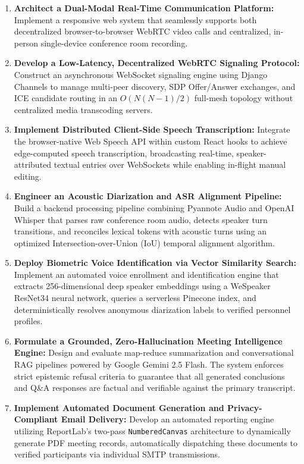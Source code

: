 \documentclass[12pt,oneside,letterpaper]{report}
\numberwithin{equation}{chapter} %
\begin{document}
\begin{enumerate}
    \item \textbf{Architect a Dual-Modal Real-Time Communication Platform:} Implement a responsive web system that seamlessly supports both decentralized browser-to-browser WebRTC video calls and centralized, in-person single-device conference room recording.
    
    \item \textbf{Develop a Low-Latency, Decentralized WebRTC Signaling Protocol:} Construct an asynchronous WebSocket signaling engine using Django Channels to manage multi-peer discovery, SDP Offer/Answer exchanges, and ICE candidate routing in an $O(N(N-1)/2)$ full-mesh topology without centralized media transcoding servers.
    
    \item \textbf{Implement Distributed Client-Side Speech Transcription:} Integrate the browser-native Web Speech API within custom React hooks to achieve edge-computed speech transcription, broadcasting real-time, speaker-attributed textual entries over WebSockets while enabling in-flight manual editing.
    
    \item \textbf{Engineer an Acoustic Diarization and ASR Alignment Pipeline:} Build a backend processing pipeline combining Pyannote Audio and OpenAI Whisper that parses raw conference room audio, detects speaker turn transitions, and reconciles lexical tokens with acoustic turns using an optimized Intersection-over-Union (IoU) temporal alignment algorithm.
    
    \item \textbf{Deploy Biometric Voice Identification via Vector Similarity Search:} Implement an automated voice enrollment and identification engine that extracts 256-dimensional deep speaker embeddings using a WeSpeaker ResNet34 neural network, queries a serverless Pinecone index, and deterministically resolves anonymous diarization labels to verified personnel profiles.
    
    \item \textbf{Formulate a Grounded, Zero-Hallucination Meeting Intelligence Engine:} Design and evaluate map-reduce summarization and conversational RAG pipelines powered by Google Gemini 2.5 Flash. The system enforces strict epistemic refusal criteria to guarantee that all generated conclusions and Q\&A responses are factual and verifiable against the primary transcript.
    
    \item \textbf{Implement Automated Document Generation and Privacy-Compliant Email Delivery:} Develop an automated reporting engine utilizing ReportLab's two-pass \texttt{NumberedCanvas} architecture to dynamically generate PDF meeting records, automatically dispatching these documents to verified participants via individual SMTP transmissions.
    

\end{enumerate}
\end{document}
